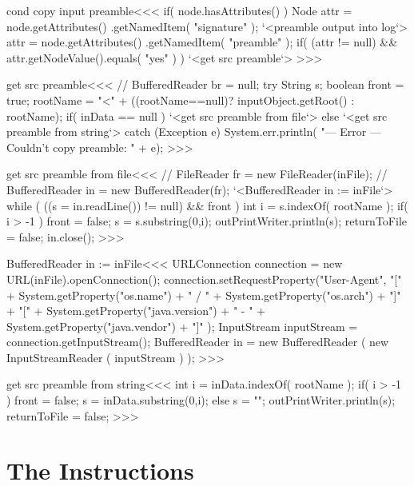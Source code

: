 \documentclass{article}
\begin{document}
{\<cond copy input preamble\><<<
if( node.hasAttributes() ){
   Node attr = node.getAttributes()
                   .getNamedItem( "signature" );
   `<preamble output into log`>
   attr = node.getAttributes()
                   .getNamedItem( "preamble" );
   if( (attr != null)
       && attr.getNodeValue().equals( "yes" ) ){
      `<get src preamble`>
} }
>>>


\<get src preamble\><<<
// BufferedReader br = null;
try {
   String s;
   boolean front = true;
   rootName = "<" + ((rootName==null)? inputObject.getRoot() : rootName);
   if( inData == null ){
      `<get src preamble from file`>
   } else {
      `<get src preamble from string`>
   }
} catch (Exception e) {
   System.err.println(
        "--- Error --- Couldn't copy preamble: " + e);
}
>>>




\<get src preamble from file\><<<
// FileReader fr = new FileReader(inFile);
// BufferedReader in = new BufferedReader(fr);
`<BufferedReader in := inFile`>
while (  ((s = in.readLine()) != null) && front ) {
   int i = s.indexOf( rootName );
   if( i > -1 ){
      front = false;
      s = s.substring(0,i);
   }
   outPrintWriter.println(s);
   returnToFile = false;
}
in.close();
>>>

\<BufferedReader in := inFile\><<<
URLConnection connection =
             new URL(inFile).openConnection();
connection.setRequestProperty("User-Agent",
                "["
              + System.getProperty("os.name")
              + " / "
              + System.getProperty("os.arch")
              + "]"
              + "["
              + System.getProperty("java.version")
              + " - "
              + System.getProperty("java.vendor")
              + "]"
);
InputStream inputStream = connection.getInputStream();
BufferedReader in = new BufferedReader (
                        new InputStreamReader ( inputStream ) );
>>>






\<get src preamble from string\><<<
int i = inData.indexOf( rootName );
if( i > -1 ){
   front = false;
   s = inData.substring(0,i);
} else { s = ""; }
outPrintWriter.println(s);
returnToFile = false;
>>>




\section{The Instructions}



}
\end{document}
